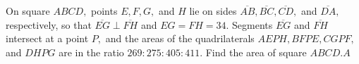 On square $ABCD,$ points $E,F,G,$ and $H$ lie on sides $\overline{AB},\overline{BC},\overline{CD},$ and $\overline{DA},$ respectively, so that $\overline{EG} \perp \overline{FH}$ and $EG=FH = 34.$ Segments $\overline{EG}$ and $\overline{FH}$ intersect at a point $P,$ and the areas of the quadrilaterals $AEPH, BFPE, CGPF,$ and $DHPG$ are in the ratio $269:275:405:411.$ Find the area of square $ABCD$.$A$